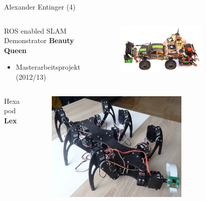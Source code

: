 \documentclass{beamer}
\begin{document}
\begin{frame}{Alexander Entinger (4)}
\begin{columns}
 \begin{column}{0.5\textwidth}
  \begin{large}ROS enabled SLAM Demonstrator \textbf{Beauty Queen}\end{large}
  \begin{itemize}
   \item Masterarbeitsprojekt (2012/13)
  \end{itemize}
 \end{column}
 \begin{column}{0.5\textwidth}
 \begin{figure}[H]
  \centering
  \includegraphics[width=0.7\textwidth]{./images/robot-beauty-queen.jpg}
  \label{fig:robot-beauty-queen}
 \end{figure}
\end{column}
\end{columns}
	
\begin{columns}
 \begin{column}{0.5\textwidth}
  \begin{large}Hexapod \textbf{Lex}\end{large}
 \end{column}
 \begin{column}{0.5\textwidth}
  \begin{figure}[H]
   \centering
   \includegraphics[width=0.7\textwidth]{./images/robot-lex.jpg}
   \label{fig:robot-lex}
  \end{figure}
 \end{column}
\end{columns}

\end{frame}
\end{document}
